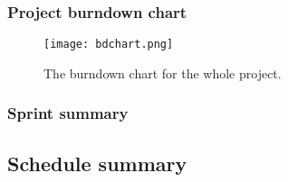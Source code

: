 	\subsubsection{Project burndown chart}
		
		\begin{figure}[H]
		  \centering
		  \graphicspath{ {./graphics/} }
		  \centerline{\texttt{[image: bdchart.png]}}
		  \caption{\label{fig:bdchart} The burndown chart for the whole project.}
		\end{figure}

	\subsubsection{Sprint summary}

\subsection{Schedule summary}